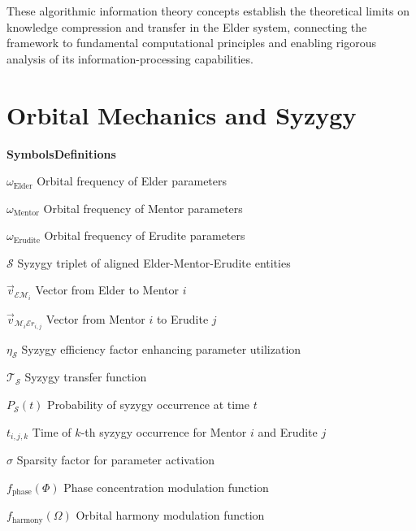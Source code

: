 \vspace{1cm}
\begin{center}
These algorithmic information theory concepts establish the theoretical limits on knowledge compression and transfer in the Elder system, connecting the framework to fundamental computational principles and enabling rigorous analysis of its information-processing capabilities.
\end{center}

\clearpage
\chapter*{Orbital Mechanics and Syzygy}

\begin{multicols}{2}
\noindent\textbf{\large Symbols}\hfill\textbf{\large Definitions}

\vspace{0.3cm}
\noindent$\omega_{\text{Elder}}$ \dotfill Orbital frequency of Elder parameters

\noindent$\omega_{\text{Mentor}}$ \dotfill Orbital frequency of Mentor parameters

\noindent$\omega_{\text{Erudite}}$ \dotfill Orbital frequency of Erudite parameters

\noindent$\mathcal{S}$ \dotfill Syzygy triplet of aligned Elder-Mentor-Erudite entities

\noindent$\vec{v}_{\mathcal{E}\mathcal{M}_i}$ \dotfill Vector from Elder to Mentor $i$

\noindent$\vec{v}_{\mathcal{M}_i\mathcal{E}r_{i,j}}$ \dotfill Vector from Mentor $i$ to Erudite $j$

\noindent$\eta_\mathcal{S}$ \dotfill Syzygy efficiency factor enhancing parameter utilization

\noindent$\mathcal{T}_{\mathcal{S}}$ \dotfill Syzygy transfer function

\noindent$P_{\mathcal{S}}(t)$ \dotfill Probability of syzygy occurrence at time $t$

\noindent$t_{i,j,k}$ \dotfill Time of $k$-th syzygy occurrence for Mentor $i$ and Erudite $j$

\noindent$\sigma$ \dotfill Sparsity factor for parameter activation

\noindent$f_{\text{phase}}(\Phi)$ \dotfill Phase concentration modulation function

\noindent$f_{\text{harmony}}(\Omega)$ \dotfill Orbital harmony modulation function


\end{multicols}
